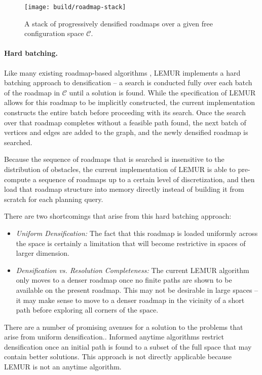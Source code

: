 \begin{figure}
   \centering
   \texttt{[image: build/roadmap-stack]}
   \caption{A stack of progressively densified roadmaps
      over a given free configuration space $\mathcal{C}$.}
   \label{fig:discussion:roadmap-stack}
\end{figure}

\paragraph{Hard batching.}
Like many existing roadmap-based algorithms
\citep{starek2015bfmtstar, gammell2015bitstar},
LEMUR implements a hard batching approach to densification --
a search is conducted fully over each batch of the roadmap
in $\mathcal{C}$
until a solution is found.
While the specification of LEMUR allows for this roadmap to be
implicitly constructed,
the current implementation constructs the entire batch before
proceeding with its search.
Once the search over that roadmap completes without a feasible path found,
the next batch of vertices and edges are added to the graph,
and the newly densified roadmap is searched.

Because the sequence of roadmaps that is searched is insensitive to
the distribution of obstacles,
the current implementation of LEMUR is able to pre-compute a sequence
of roadmaps up to a certain level of discretization,
and then load that roadmap structure into memory directly
instead of building it from scratch for each planning query.

There are two shortcomings that arise from this hard batching approach:

\begin{itemize}
\item \emph{Uniform Densification:}
   The fact that this roadmap is loaded uniformly across the space
   is certainly a limitation that will become restrictive
   in spaces of larger dimension.
\item \emph{Densification vs. Resolution Completeness:}
   The current LEMUR algorithm only moves to a denser roadmap
   once no finite paths are shown to be available on the present
   roadmap.
   This may not be desirable in large spaces --
   it may make sense to move to a denser roadmap in the vicinity of
   a short path before exploring all corners of the space.
\end{itemize}

There are a number of promising avenues for a solution
to the problems that arise from uniform densification..
Informed anytime algorithms
\citep{gammell2014informedrrtstar, gammell2015bitstar}
restrict densification once an initial path is found to a subset of
the full space that may contain better solutions.
This approach is not directly applicable
because LEMUR is not an anytime algorithm.

